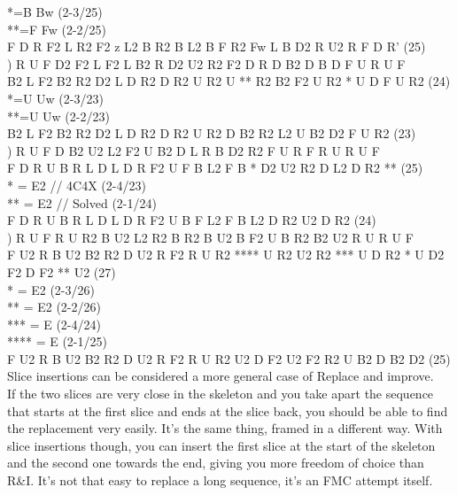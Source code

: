 \documentclass[11pt,a4paper]{book}
\newcommand{\p}{\textquotesingle}
\newcommand{\ps}{\p\,\,}
\begin{document}
*=B Bw\ps (2-3/25)\\
**=F Fw\ps (2-2/25)\\
F\ps D\ps R\ps F2 L R2 F2 z L2 B R2 B\ps L2 B F R2 Fw\ps L B\ps D2 R\ps U2 R\ps F D R’ (25)\\
) R\ps U\ps F D2 F2 L\ps F2 L\ps B2 R D2 U2 R2 F2 D\ps R D\ps B2 D B\ps D F U\ps R\ps U\ps F \\
\newline
B2 L F2 B2 R2 D2 L\ps D R2 D R2 U\ps R2 U ** R2 B2 F2 U\ps R2 * U\ps D\ps F U\ps R2 (24)\\
*=U Uw\ps (2-3/23)\\
**=U\ps Uw (2-2/23)\\
B2 L F2 B2 R2 D2 L\ps D R2 D R2 U\ps R2 D B2 R2 L2 U\ps B2 D2 F U\ps R2 (23)\\
) R\ps U\ps F D B2 U2 L2 F2 U B2 D L R\ps B D2 R2 F\ps U R\ps F\ps R\ps U R\ps U\ps F\\
\newline
F D R U B R L\ps D L D\ps R\ps F2 U F B L2 F B * D2 U2 R2 D\ps L2 D R2 ** (25)\\
* = E2 // 4C4X (2-4/23)\\
** = E2 // Solved (2-1/24)\\
F D R U B R L\ps D L D\ps R\ps F2 U B F L2 F B L2 D\ps R2 U2 D\ps R2 (24)\\
) R\ps U\ps F R U R2 B\ps U2 L2 R2 B\ps R2 B\ps U2 B F2 U B\ps R2 B2 U2 R\ps U R\ps U\ps F\\
\newline
F U2 R\ps B U2 B2 R2 D U2 R\ps F2 R U R2 **** U R2 U2 R2 *** U D\ps R2 * U\ps D2 F2 D F2 ** U2 (27)\\
* = E2 (2-3/26)\\
** = E2 (2-2/26)\\
*** = E (2-4/24)\\
**** = E\ps (2-1/25)\\
F U2 R\ps B U2 B2 R2 D U2 R\ps F2 R U R2 U2 D\ps F2 U2 F2 R2 U B2 D B2 D2 (25)\\
\newline
Slice insertions can be considered a more general case of Replace and improve. \\
If the two slices are very close in the skeleton and you take apart the sequence that starts at the first slice and ends at the slice back, you should be able to find the replacement very easily. It’s the same thing, framed in a different way. With slice insertions though, you can insert the first slice at the start of the skeleton and the second one towards the end, giving you more freedom of choice than R\&I. It’s not that easy to replace a long sequence, it’s an FMC attempt itself.
\end{document}
